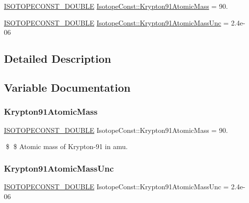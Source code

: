 \begin{DoxyCompactItemize}
\item 
\mbox{\hyperlink{group___isotope_const-_macros_ga8f45a7272ce02c0b4c65c44636ed719a}{I\+S\+O\+T\+O\+P\+E\+C\+O\+N\+S\+T\+\_\+\+D\+O\+U\+B\+LE}} \mbox{\hyperlink{group___isotope_const-_krypton-_kr91_ga6d37ecaaf40512f6a25551bf2eefe698}{Isotope\+Const\+::\+Krypton91\+Atomic\+Mass}} = 90.
\item 
\mbox{\hyperlink{group___isotope_const-_macros_ga8f45a7272ce02c0b4c65c44636ed719a}{I\+S\+O\+T\+O\+P\+E\+C\+O\+N\+S\+T\+\_\+\+D\+O\+U\+B\+LE}} \mbox{\hyperlink{group___isotope_const-_krypton-_kr91_gacb563a0b2c81569b6f823a83d06e047c}{Isotope\+Const\+::\+Krypton91\+Atomic\+Mass\+Unc}} = 2.\+4e-\/06
\end{DoxyCompactItemize}


\subsection{Detailed Description}


\subsection{Variable Documentation}
\mbox{\label{group___isotope_const-_krypton-_kr91_ga6d37ecaaf40512f6a25551bf2eefe698}} 
\subsubsection{\texorpdfstring{Krypton91\+Atomic\+Mass}{Krypton91AtomicMass}}
{\footnotesize\ttfamily \mbox{\hyperlink{group___isotope_const-_macros_ga8f45a7272ce02c0b4c65c44636ed719a}{I\+S\+O\+T\+O\+P\+E\+C\+O\+N\+S\+T\+\_\+\+D\+O\+U\+B\+LE}} Isotope\+Const\+::\+Krypton91\+Atomic\+Mass = 90.}

\$ \$ Atomic mass of Krypton-\/91 in amu. \mbox{\label{group___isotope_const-_krypton-_kr91_gacb563a0b2c81569b6f823a83d06e047c}} 
\subsubsection{\texorpdfstring{Krypton91\+Atomic\+Mass\+Unc}{Krypton91AtomicMassUnc}}
{\footnotesize\ttfamily \mbox{\hyperlink{group___isotope_const-_macros_ga8f45a7272ce02c0b4c65c44636ed719a}{I\+S\+O\+T\+O\+P\+E\+C\+O\+N\+S\+T\+\_\+\+D\+O\+U\+B\+LE}} Isotope\+Const\+::\+Krypton91\+Atomic\+Mass\+Unc = 2.\+4e-\/06}

